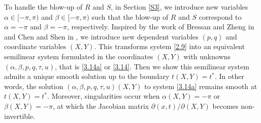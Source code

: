 \documentclass[11pt,reqno]{article}
\newcommand{\pa}{\partial}
\numberwithin{equation}{section}
\begin{document}
To handle the blow-up of $R$ and $S$, in Section \ref{S3}, we introduce new variables $\alpha\in[-\pi,\pi)$ and $\beta\in[-\pi,\pi)$ such that the blow-up of $R$ and $S$ correspond to $\alpha=-\pi$ and $\beta=-\pi$, respectively. Inspired by the work of Bressan and Zheng in \cite{BZ} and Chen and Shen in \cite{CS}, we introduce new dependent variables $(p, q)$ and coordinate variables $(X,Y)$.
This transforms system \eqref{2.9} into an equivalent semilinear system formulated in the coordinates $(X,Y)$ with unknowns $(\alpha, \beta, p, q, \tau, u)$, that is \eqref{3.14a} or \eqref{3.14}. Then we show this semilinear system admits a unique smooth solution up to the boundary $t(X,Y)=t^*$. In other words, the solution $(\alpha, \beta, p, q, \tau, u)(X,Y)$ to system \eqref{3.14a} remains smooth at $t(X,Y)=t^*$. Moreover, singularities occur when $\alpha(X,Y)=-\pi$ or $\beta(X,Y)=-\pi$, at which the Jacobian matrix $\pa(x,t)/\pa(X,Y)$ becomes non-invertible.
\end{document}
